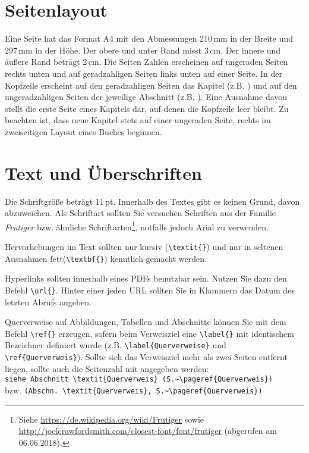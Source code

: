 \documentclass[twoside,bibliography=totoc,openany]{fumi}
\begin{document}
\section{Seitenlayout}

Eine Seite hat das Format A4 mit den Abmessungen 210\,mm in der Breite und 297\,mm in der Höhe. Der obere und unter Rand misst 3\,cm. Der innere und äußere Rand beträgt 2\,cm. Die Seiten Zahlen erscheinen auf ungeraden Seiten rechts unten und auf geradzahligen Seiten links unten auf einer Seite. In der Kopfzeile erscheint auf den geradzahligen Seiten das Kapitel (z.B. ) und auf den ungeradzahligen Seiten der jeweilige Abschnitt (z.B. ). Eine Ausnahme davon stellt die erste Seite eines Kapitels dar, auf denen die Kopfzeile leer bleibt. Zu beachten ist, dass neue Kapitel stets auf einer ungeraden Seite, rechts im zweiseitigen Layout eines Buches beginnen. 


\section{Text und Überschriften}
Die Schriftgröße beträgt 11\,pt. Innerhalb des Textes gibt es keinen Grund, davon abzuweichen. Als Schriftart sollten Sie versuchen Schriften aus der Familie \textit{Frutiger} bzw. ähnliche Schriftarten\footnote{Siehe \url{https://de.wikipedia.org/wiki/Frutiger} sowie \url{http://joelcrawfordsmith.com/closest-font/font/frutiger} (abgerufen am 06.06.2018).}, notfalls jedoch Arial zu verwenden. %

Hervorhebungen im Text sollten nur kursiv (\verb|\textit{}|) und nur in seltenen Ausnahmen fett\linebreak (\verb|\textbf{}|) kenntlich gemacht werden. 

Hyperlinks sollten innerhalb eines PDFs benutzbar sein. Nutzen Sie dazu den Befehl \verb|\url{}|. Hinter einer jeden URL sollten Sie in Klammern das Datum des letzten Abrufs angeben.

Querverweise auf Abbildungen, Tabellen und Abschnitte können Sie mit dem Befehl \verb|\ref{}| erzeugen, sofern beim Verweisziel eine \verb|\label{}| mit identischem Bezeichner definiert wurde (z.B. \verb|\label{Querverweise}| und \verb|\ref{Querverweis}|). Sollte sich das Verweisziel mehr als zwei Seiten entfernt liegen, sollte auch die Seitenzahl mit angegeben werden:\\ 
\verb|siehe Abschnitt \textit{Querverweis} (S.~\pageref{Querverweis})|\\ bzw. 
\verb|(Abschn. \textit{Querverweis}, S.~\pageref{Querverweis})|
\end{document}
